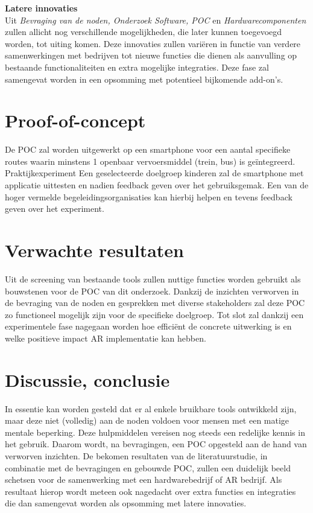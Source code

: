 \documentclass{hogent-article}
\begin{document}
    \textbf{Latere innovaties} \\
    
    Uit \emph{Bevraging van de noden, Onderzoek Software, POC} en \emph{Hardwarecomponenten} zullen allicht nog verschillende mogelijkheden, die later kunnen toegevoegd worden, tot uiting komen. Deze innovaties zullen variëren in functie van verdere samenwerkingen met bedrijven tot nieuwe functies die dienen als aanvulling op bestaande functionaliteiten en extra mogelijke integraties. Deze fase zal samengevat worden in een opsomming met potentieel bijkomende add-on's.
    
    \section{Proof-of-concept}%
    \label{sec:proof-of-concept}
    De POC zal worden uitgewerkt op een smartphone voor een aantal specifieke routes waarin minstens 1 openbaar vervoersmiddel (trein, bus) is geïntegreerd.
    Praktijkexperiment
    Een geselecteerde doelgroep kinderen zal de smartphone met applicatie uittesten en nadien feedback geven over het gebruiksgemak. Een van de hoger vermelde begeleidingsorganisaties kan hierbij helpen en tevens feedback geven over het experiment.



    \section{Verwachte resultaten}%
    \label{sec:verwachte-resultaten}
    
    Uit de screening van bestaande tools zullen nuttige functies worden gebruikt als bouwstenen voor de POC van dit onderzoek. Dankzij de inzichten verworven in de bevraging van de noden en gesprekken met diverse stakeholders zal deze POC zo functioneel mogelijk zijn voor de specifieke doelgroep. Tot slot zal dankzij een experimentele fase nagegaan worden hoe efficiënt de concrete uitwerking is en welke positieve impact AR implementatie kan hebben.
    
    
    \section{Discussie, conclusie}%
    \label{sec:discussie-conclusie}
    In essentie kan worden gesteld dat er al enkele bruikbare tools ontwikkeld zijn, maar deze niet (volledig) aan de noden voldoen voor mensen met een matige mentale beperking. Deze hulpmiddelen vereisen nog steeds een redelijke kennis in het gebruik. Daarom wordt, na bevragingen, een POC opgesteld aan de hand van verworven inzichten. De bekomen resultaten van de literatuurstudie, in combinatie met de bevragingen en gebouwde POC, zullen een duidelijk beeld schetsen voor de samenwerking met een hardwarebedrijf of AR bedrijf. Als resultaat hierop wordt meteen ook nagedacht over extra functies en integraties die dan samengevat worden als opsomming met latere innovaties.
\end{document}
